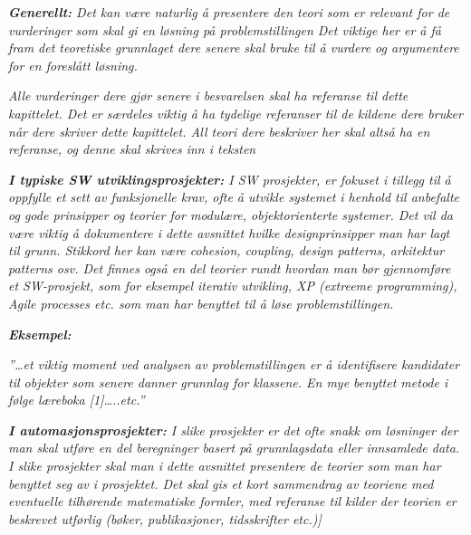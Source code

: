 \documentclass[../main.tex]{subfiles}
\begin{document}
{\itshape\color{blue}
\textbf{Generellt:} Det kan v{\ae}re naturlig {\aa} presentere den teori som er relevant for de vurderinger som skal gi
en l{\o}sning p{\aa} problemstillingen Det viktige her er {\aa} f{\aa} fram det teoretiske grunnlaget dere senere skal
bruke til {\aa} vurdere og argumentere for en foresl{\aa}tt l{\o}sning. }

{\itshape\color{blue}
Alle vurderinger dere gj{\o}r senere i besvarelsen skal ha referanse til dette kapittelet. Det er s{\ae}rdeles viktig
{\aa} ha tydelige referanser til de kildene dere bruker n{\aa}r dere skriver dette kapittelet. All teori dere beskriver
her skal alts{\aa} ha en referanse, og denne skal skrives inn i teksten}

{\itshape\color{blue}
\textbf{I typiske SW utviklingsprosjekter:} I SW prosjekter, er fokuset i tillegg til {\aa} oppfylle et sett av
funksjonelle krav, ofte {\aa} utvikle systemet i henhold til anbefalte og gode prinsipper og teorier for modul{\ae}re,
objektorienterte systemer. Det vil da v{\ae}re viktig {\aa} dokumentere i dette avsnittet hvilke designprinsipper man
har lagt til grunn. Stikkord her kan v{\ae}re cohesion, coupling, design patterns, arkitektur patterns osv. Det finnes
ogs{\aa} en del teorier rundt hvordan man b{\o}r gjennomf{\o}re et SW-prosjekt, som for eksempel iterativ utvikling, XP
(extreeme programming), Agile processes etc. som man har benyttet til {\aa} l{\o}se problemstillingen.}

{\bfseries\itshape\color{blue}
Eksempel:}

{\itshape\color{blue}
{}''{\dots}et viktig moment ved analysen av problemstillingen er {\aa} identifisere kandidater til objekter som senere
danner grunnlag for klassene. En mye benyttet metode i f{\o}lge l{\ae}reboka [1]{\dots}..etc.''}


\bigskip

{\itshape\color{blue}
\textbf{I automasjonsprosjekter:} I slike prosjekter er det ofte snakk om l{\o}sninger der man skal utf{\o}re en del
beregninger basert p{\aa} grunnlagsdata eller innsamlede data. I slike prosjekter skal man i dette avsnittet presentere
de teorier som man har benyttet seg av i prosjektet. Det skal gis et kort sammendrag av teoriene med eventuelle
tilh{\o}rende matematiske formler, med referanse til kilder der teorien er beskrevet utf{\o}rlig (b{\o}ker,
publikasjoner, tidsskrifter etc.)]}


\bigskip
\end{document}
